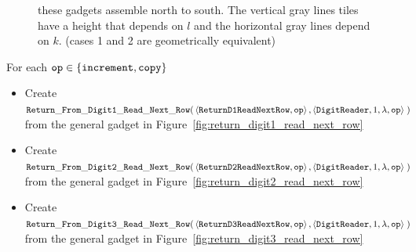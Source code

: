 \begin{figure}[H]
{these gadgets assemble north to south. The vertical gray lines tiles have a height
    that depends on $l$ and the horizontal gray lines depend on $k$. (cases 1 and 2 are geometrically equivalent)}
\end{figure}

\noindent For each ${\tt op} \in \{  {\tt increment, copy } \}$

\begin{itemize}
    \item Create
    $\begin{aligned}[t]
        {\tt Return\_From\_Digit1\_Read\_Next\_Row}(& \left \langle {\tt ReturnD1ReadNextRow},     {\tt op} \right\rangle,
                                     \left \langle {\tt DigitReader}, 1, \lambda, {\tt op} \right\rangle \;)
    \end{aligned}$
    \\ from the general gadget in Figure~\ref{fig:return_digit1_read_next_row}

    \item Create
    $\begin{aligned}[t]
        {\tt Return\_From\_Digit2\_Read\_Next\_Row}(& \left \langle {\tt ReturnD2ReadNextRow},     {\tt op} \right\rangle,
                                     \left \langle {\tt DigitReader}, 1, \lambda, {\tt op} \right\rangle \;)
    \end{aligned}$
    \\ from the general gadget in Figure~\ref{fig:return_digit2_read_next_row}

    \item Create
    $\begin{aligned}[t]
        {\tt Return\_From\_Digit3\_Read\_Next\_Row}(& \left \langle {\tt ReturnD3ReadNextRow},     {\tt op} \right\rangle,
                                       \left \langle {\tt DigitReader}, 1, \lambda, {\tt op} \right\rangle \;)
    \end{aligned}$
    \\ from the general gadget in Figure~\ref{fig:return_digit3_read_next_row}
\end{itemize}